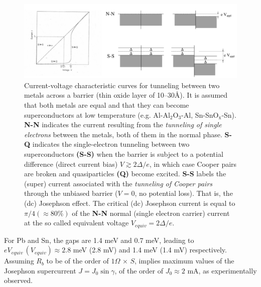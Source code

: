   \begin{figure}
  	\centerline{\includegraphics[width=17cm]{C6/figs_C6/fig4_6_1x}}
  	\caption{Current-voltage characteristic curves for tunneling between two metals across a barrier (thin oxide layer of 10--30\AA). It is assumed that both metals are  equal and that they can become superconductors at low temperature (e.g. Al-Al$_2$O$_3$-Al, Sn-SnO$_\text{x}$-Sn). \textbf{N-N} indicates the  current resulting from the \textit{tunneling of single electrons} between the metals, both of them in the normal phase. \textbf{S-Q} indicates the single-electron tunneling between two superconductors \textbf{(S-S)} when the barrier is subject to a potential difference (direct current bias) $V\gtrsim2\Delta/e$, in which case Cooper pairs are broken and quasiparticles \textbf{(Q)} become excited. \textbf{S-S} labels the (super) current associated with the \textit{tunneling of Cooper pairs} through the unbiased barrier ($V=0$, no potential loss). That is, the (dc) Josephson effect. The critical (dc) Josephson current  is equal to $\pi/4(\approx80\%)$ of the \textbf{N-N}  normal (single electron carrier) current at the so called equivalent  voltage $V_{equiv}=2\Delta/e$. }\label{fig4.6.1}
  \end{figure}
  
  For Pb and Sn, the gaps are 1.4 meV and 0.7 meV, leading to $e V_{equiv} \,(V_{equiv})\approx 2.8$ meV (2.8 mV) and 1.4 meV (1.4 mV) respectively. Assuming $R_b$ to be of the order of $1\Omega\,\times\, S$, implies maximum values of the Josephson supercurrent $J=J_0\sin\gamma$, of the order of $J_0\approx 2$ mA, as experimentally observed.
 
